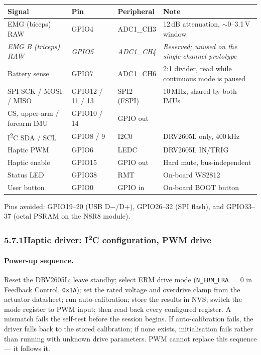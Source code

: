 \documentclass[11pt]{article}
\begin{document}
\begin{table}[H]
\centering\small
\begin{tabularx}{\linewidth}{@{}p{38mm} p{16mm} p{20mm} X@{}}
\toprule
\textbf{Signal} & \textbf{Pin} & \textbf{Peripheral} & \textbf{Note} \\
\midrule
EMG (biceps) RAW & GPIO4 & ADC1\_CH3 & 12\,dB attenuation, $\sim$0--3.1\,V window \\
\textit{EMG B (triceps) RAW} & \textit{GPIO5} & \textit{ADC1\_CH4} & \textit{Reserved; unused on the single-channel prototype} \\
Battery sense & GPIO7 & ADC1\_CH6 & 2:1 divider, read while continuous mode is paused \\
SPI SCK / MOSI / MISO & GPIO12 / 11 / 13 & SPI2 (FSPI) & 10\,MHz, shared by both IMUs \\
CS, upper-arm / forearm IMU & GPIO10 / 14 & GPIO out & \\
I\textsuperscript{2}C SDA / SCL & GPIO8 / 9 & I2C0 & DRV2605L only, 400\,kHz \\
Haptic PWM & GPIO6 & LEDC & DRV2605L IN/TRIG \\
Haptic enable & GPIO15 & GPIO out & Hard mute, bus-independent \\
Status LED & GPIO38 & RMT & On-board WS2812 \\
User button & GPIO0 & GPIO in & On-board BOOT button \\
\bottomrule
\end{tabularx}
\end{table}

\noindent
Pins avoided: GPIO19--20 (USB D$-$/D$+$), GPIO26--32 (SPI flash), and
GPIO33--37 (octal PSRAM on the N8R8 module).

\subsubsection*{5.7.1\quad Haptic driver: I\textsuperscript{2}C configuration, PWM drive}

\paragraph{Power-up sequence.} Reset the DRV2605L; leave standby; select ERM
drive mode (\texttt{N\_ERM\_LRA} $=0$ in Feedback Control, \texttt{0x1A}); set
the rated voltage and overdrive clamp from the actuator datasheet; run
auto-calibration; store the results in NVS; switch the mode register to PWM
input; then read back every configured register. A mismatch
fails the self-test before the session begins. If auto-calibration fails, the
driver falls back to the stored calibration; if none exists, initialisation
fails rather than running with unknown drive parameters. PWM cannot replace this
sequence --- it follows it.
\end{document}
